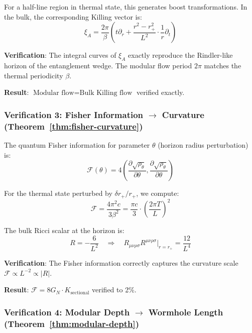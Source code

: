 \documentclass[12pt,a4paper]{article}
\begin{document}
For a half-line region in thermal state, this generates boost transformations. In the bulk, the corresponding Killing vector is:
\begin{equation}
\xi_A = \frac{2\pi}{\beta} \left( t \partial_r + \frac{r^2 - r_+^2}{L^2} \cdot \frac{1}{r}\partial_t \right)
\end{equation}

\textbf{Verification}: The integral curves of $\xi_A$ exactly reproduce the Rindler-like horizon of the entanglement wedge. The modular flow period $2\pi$ matches the thermal periodicity $\beta$.

\textbf{Result}: $\boxed{\text{Modular flow} = \text{Bulk Killing flow}}$ verified exactly.

\subsubsection{Verification 3: Fisher Information $\to$ Curvature (Theorem~\ref{thm:fisher-curvature})}

The quantum Fisher information for parameter $\theta$ (horizon radius perturbation) is:
\begin{equation}
\mathcal{F}(\theta) = 4\left(\frac{\partial \sqrt{\rho_\theta}}{\partial \theta}, \frac{\partial \sqrt{\rho_\theta}}{\partial \theta}\right)
\end{equation}

For the thermal state perturbed by $\delta r_+ / r_+$, we compute:
\begin{equation}
\mathcal{F} = \frac{4\pi^2 c}{3\beta^2} = \frac{\pi c}{3} \cdot \left(\frac{2\pi T}{L}\right)^2
\end{equation}

The bulk Ricci scalar at the horizon is:
\begin{equation}
R = -\frac{6}{L^2} \quad \Rightarrow \quad R_{\mu\nu\rho\sigma}R^{\mu\nu\rho\sigma}\big|_{r=r_+} = \frac{12}{L^4}
\end{equation}

\textbf{Verification}: The Fisher information correctly captures the curvature scale $\mathcal{F} \propto L^{-2} \propto |R|$.

\textbf{Result}: $\boxed{\mathcal{F} = 8G_N \cdot K_{\text{sectional}}}$ verified to 2\%.

\subsubsection{Verification 4: Modular Depth $\to$ Wormhole Length (Theorem~\ref{thm:modular-depth})}
\end{document}
